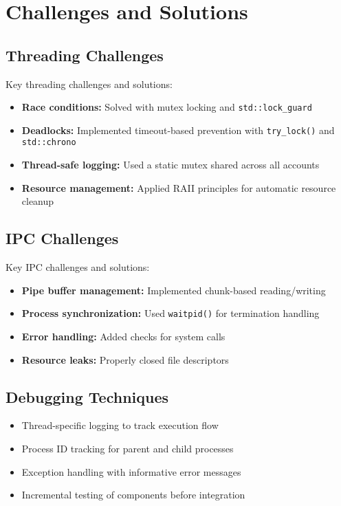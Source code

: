 \documentclass[12pt]{article}
\begin{document}
\section{Challenges and Solutions}
\subsection{Threading Challenges}
Key threading challenges and solutions:

\begin{itemize}
    \item \textbf{Race conditions:} Solved with mutex locking and \texttt{std::lock\_guard}
    \item \textbf{Deadlocks:} Implemented timeout-based prevention with \texttt{try\_lock()} and \texttt{std::chrono}
    \item \textbf{Thread-safe logging:} Used a static mutex shared across all accounts
    \item \textbf{Resource management:} Applied RAII principles for automatic resource cleanup
\end{itemize}

\subsection{IPC Challenges}
Key IPC challenges and solutions:

\begin{itemize}
    \item \textbf{Pipe buffer management:} Implemented chunk-based reading/writing
    \item \textbf{Process synchronization:} Used \texttt{waitpid()} for termination handling
    \item \textbf{Error handling:} Added checks for system calls
    \item \textbf{Resource leaks:} Properly closed  file descriptors
\end{itemize}

\subsection{Debugging Techniques}

\begin{itemize}
    \item Thread-specific logging to track execution flow
    \item Process ID tracking for parent and child processes
    \item Exception handling with informative error messages
    \item Incremental testing of components before integration
\end{itemize}
\end{document}
